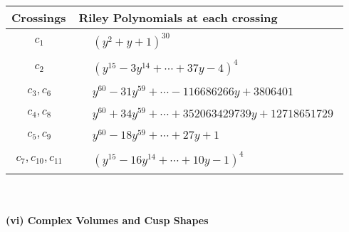 \documentclass[1p]{elsarticle_modified}
\theoremstyle{definition}
\begin{document}
\begin{tabular}{m{50pt}|m{274pt}}
Crossings & \hspace{64pt}Riley Polynomials at each crossing \\
\hline $$\begin{aligned}c_{1}\end{aligned}$$&$\begin{aligned}
&(y^2+y+1)^{30}
\end{aligned}$\\
\hline $$\begin{aligned}c_{2}\end{aligned}$$&$\begin{aligned}
&(y^{15}-3 y^{14}+\cdots+37 y-4)^{4}
\end{aligned}$\\
\hline $$\begin{aligned}c_{3},c_{6}\end{aligned}$$&$\begin{aligned}
&y^{60}-31 y^{59}+\cdots-116686266 y+3806401
\end{aligned}$\\
\hline $$\begin{aligned}c_{4},c_{8}\end{aligned}$$&$\begin{aligned}
&y^{60}+34 y^{59}+\cdots+352063429739 y+12718651729
\end{aligned}$\\
\hline $$\begin{aligned}c_{5},c_{9}\end{aligned}$$&$\begin{aligned}
&y^{60}-18 y^{59}+\cdots+27 y+1
\end{aligned}$\\
\hline $$\begin{aligned}c_{7},c_{10},c_{11}\end{aligned}$$&$\begin{aligned}
&(y^{15}-16 y^{14}+\cdots+10 y-1)^{4}
\end{aligned}$\\
\hline
\end{tabular}\\~\\
\newpage\flushleft \textbf{(vi) Complex Volumes and Cusp Shapes}
\end{document}
